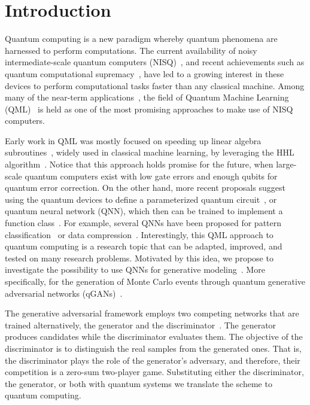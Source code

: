 \documentclass[twocolumn,preprintnumbers,superscriptaddress]{revtex4-2}
\begin{document}
\section{Introduction}

Quantum computing is a new paradigm whereby quantum phenomena are harnessed to
perform computations. The current availability of noisy intermediate-scale
quantum computers (NISQ)~\cite{nisq}, and recent achievements such as quantum
computational supremacy~\cite{supremacy, zhong2020quantum}, have led to a
growing interest in these devices to perform computational tasks faster than any
classical machine. Among many of the near-term
applications~\cite{cerezo2021variational, bharti2021noisy}, the field of Quantum
Machine Learning (QML)~\cite{biamonte2017quantum, schuld2018supervised} is held
as one of the most promising approaches to make use of NISQ computers.

Early work in QML was mostly focused on speeding up linear algebra
subroutines~\cite{wiebe2012quantum, lloyd:2013ml, Rebentrost:2014svm,
kerenidis2020quantum}, widely used in classical machine learning, by leveraging
the HHL algorithm~\cite{harrow2009quantum}. Notice that this approach holds
promise for the future, when large-scale quantum computers exist with low gate
errors and enough qubits for quantum error correction. On the other hand, more
recent proposals suggest using the quantum devices to define a parameterized
quantum circuit~\cite{benedetti2019parameterized, sim2019expressibility,
bravo2020scaling}, or quantum neural network (QNN), which then can be trained to
implement a function class~\cite{schuld2021effect, goto2021universal,
perez2021one}. For example, several QNNs have been proposed for pattern
classification~\cite{havlivcek2019supervised, Schuld:2020circuit,
perezsalinas:2020reuploading} or data compression~\cite{romero2017quantum,
bravo2021quantum, cao2021noise}. Interestingly, this QML approach to quantum
computing is a research topic that can be adapted, improved, and tested on many
research problems. Motivated by this idea, we propose to investigate the
possibility to use QNNs for generative modeling~\cite{benedetti2019generative,
hamilton2019generative, coyle2020born}. More specifically, for the generation of
Monte Carlo events through quantum generative adversarial networks
(qGANs)~\cite{dallaire2018quantum, lloyd2018quantum}.

The generative adversarial framework employs two competing networks that are
trained alternatively, the generator and the
discriminator~\cite{goodfellow2014generative}. The generator produces candidates
while the discriminator evaluates them. The objective of the discriminator is to
distinguish the real samples from the generated ones. That is, the discriminator
plays the role of the generator's adversary, and therefore, their competition is
a zero-sum two-player game. Substituting either the discriminator, the
generator, or both with quantum systems we translate the scheme to quantum
computing.
\end{document}
